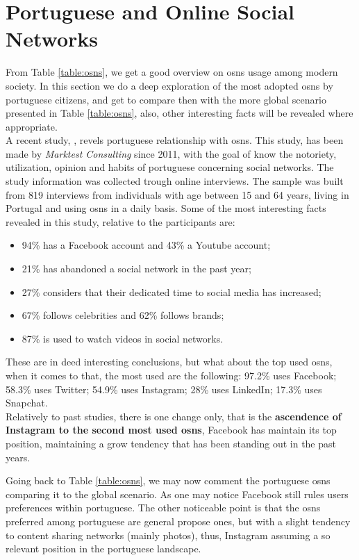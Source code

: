 \section{Portuguese and Online Social Networks}
From Table \ref{table:osns}, we get a good overview on \glspl{osn} usage among modern society. In this section we do a deep exploration of the most adopted \glspl{osn} by portuguese citizens,
and get to compare then with the more global scenario presented in Table \ref{table:osns}, also, other interesting facts will be revealed where appropriate.\\
\indent A recent study, \cite{marktest2016}, revels portuguese relationship with \glspl{osn}. This study, has been made by \textit{Marktest Consulting} since 2011, with the goal of know the notoriety, utilization, opinion
and habits of portuguese concerning social networks. The study information was collected trough online interviews. The sample was built from 819 interviews from individuals with age between
15 and 64 years, living in Portugal and using \glspl{osn} in a daily basis.
\indent Some of the most interesting facts revealed in this study, relative to the participants are:
\begin{itemize}
  \item 94\% has a Facebook account and 43\% a Youtube account;
  \item 21\% has abandoned a social network in the past year;
  \item 27\% considers that their dedicated time to social media has increased;
  \item 67\% follows celebrities and 62\% follows brands;
  \item 87\% is used to watch videos in social networks.
\end{itemize}

\indent These are in deed interesting conclusions, but what about the top used \glspl{osn}, when it comes to that, the most used are the following: 97.2\% uses Facebook; 58.3\% uses Twitter; 54.9\% uses Instagram; 28\% uses LinkedIn;
17.3\% uses Snapchat.\\
\indent Relatively to \cite{marktest2016} past studies, there is one change only, that is the \textbf{ascendence of Instagram to the second most used \glspl{osn}}, Facebook has maintain
its top position, maintaining a grow tendency that has been standing out in the past years.

\indent Going back to Table \ref{table:osns}, we may now comment the portuguese \glspl{osn} comparing it
to the global scenario. As one may notice Facebook still rules users preferences within portuguese.
The other noticeable point is that the \glspl{osn} preferred among portuguese are general propose ones,
but with a slight tendency to content sharing networks (mainly photos), thus, Instagram assuming
a so relevant position in the portuguese landscape.

